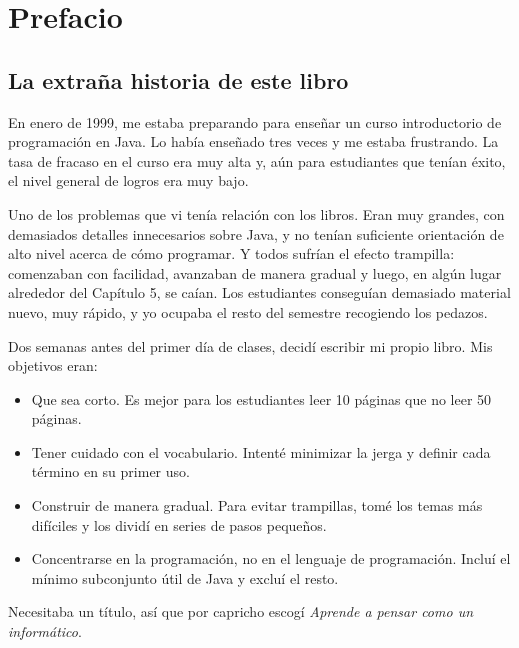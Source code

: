 \documentclass[10pt]{book}
\begin{document}
\fi


\chapter{Prefacio}

\section*{La extraña historia de este libro}

En enero de 1999, me estaba preparando para enseñar un curso introductorio
de programación en Java.  Lo había enseñado tres veces y me estaba frustrando.
La tasa de fracaso en el curso era muy alta y, aún para estudiantes que
tenían éxito, el nivel general de logros era muy bajo.

Uno de los problemas que vi tenía relación con los libros.
Eran muy grandes, con demasiados detalles innecesarios sobre Java, y
no tenían suficiente orientación de alto nivel acerca de cómo programar.  Y todos
sufrían el efecto trampilla: comenzaban con facilidad,
avanzaban de manera gradual y luego, en algún lugar alrededor del Capítulo 5,
se caían.  Los estudiantes conseguían demasiado material nuevo,
muy rápido, y yo ocupaba el resto del semestre recogiendo los pedazos.

Dos semanas antes del primer día de clases, decidí escribir mi propio libro.
Mis objetivos eran:

\begin{itemize}

\item Que sea corto.  Es mejor para los estudiantes leer 10 páginas que
no leer 50 páginas.

\item Tener cuidado con el vocabulario.  Intenté minimizar la jerga y
definir cada término en su primer uso.

\item Construir de manera gradual. Para evitar trampillas, tomé los temas más difíciles
y los dividí en series de pasos pequeños.

\item Concentrarse en la programación, no en el lenguaje de programación.  Incluí
el mínimo subconjunto útil de Java y excluí el resto.

\end{itemize}

Necesitaba un título, así que por capricho escogí {\em Aprende a pensar como
un informático}.
\end{document}
